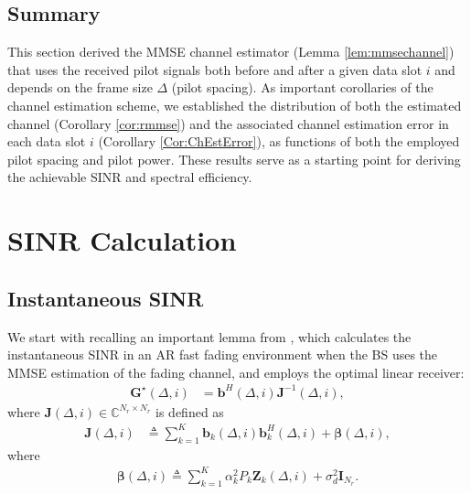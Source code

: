 \documentclass[conference, a4paper, 10pt]{IEEEtran}
\newcommand{\mx}[1]{\mathbf{#1}}
\newcommand{\bs}[1]{\boldsymbol{#1}}
\begin{document}
\subsection{Summary}

This section derived the \ac{MMSE} channel estimator (Lemma \ref{lem:mmsechannel})
that uses the received pilot signals
both before and after a given data slot $i$ and depends on the frame size $\Delta$ (pilot spacing).
As important corollaries of the channel estimation scheme, we established the distribution
of both the estimated channel (Corollary \ref{cor:rmmse})
and the associated channel estimation error in each data
slot $i$ (Corollary \ref{Cor:ChEstError}), as functions of both the employed pilot spacing and pilot power. These
results serve as a starting point for deriving the achievable \ac{SINR} and spectral
efficiency.

\section{\ac{SINR} Calculation}
\label{Sec:SINR}

\subsection{Instantaneous \ac{SINR}}
We start with recalling an important lemma from \cite{Fodor:22}, which calculates the instantaneous \ac{SINR}
in an \ac{AR} fast fading environment
when the \ac{BS} uses the \ac{MMSE} estimation of the fading channel, and employs the optimal linear
receiver:
\begin{align}
\label{eq:Gstar2}
\mx{G}^\star(\Delta, i) &=
\mx{b}^H(\Delta,i) \mx{J}^{-1}(\Delta,i),
\end{align}
where $\mx{J}(\Delta, i) \in \mathds{C}^{N_r \times N_r}$
is defined as
\begin{align}
\nonumber
\mx{J}(\Delta, i)
&\triangleq
\sum_{k=1}^K  \mx{b}_k(\Delta, i) \mx{b}_k^H(\Delta, i) + \bs{\beta}(\Delta, i),
\end{align}
where
\begin{align}
\label{eq:beta}
\bs{\beta}(\Delta, i) \triangleq \sum_{k=1}^K \alpha_k^2 P_k  \mx{Z}_k(\Delta, i) + \sigma^2_d \mx{I}_{N_r}.
\end{align}
\end{document}
